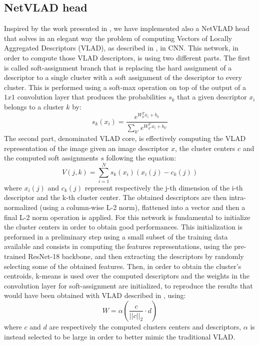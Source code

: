 \documentclass[10pt,twocolumn,letterpaper]{article}
\begin{document}
\subsection{NetVLAD head}\label{sec:NETVLAD}
Inspired by the work presented in \cite{NETVLAD}, we have implemented also a NetVLAD head that solves in an 
elegant way the problem of computing Vectors of Locally Aggregated Descriptors (VLAD), as described in \cite{VLAD},
in CNN. This network, in order to compute those VLAD descriptors, is using two different parts. 
The first is called soft-assignment branch that is replacing the hard assignment of a descriptor to a single cluster
with a soft assignment of the descriptor to every cluster. This is performed using a soft-max operation on top of the output of a $1x1$
 convolution layer that produces the probabilities $s_k$ that a given descriptor $x_i$ belongs to a cluster $k$ by:
 \begin{equation}
    s_k(x_i) = {\frac{e^{W_k^T x_i+b_k}}{\sum_{k'} e^{W_{k'}^T x_i+b_{k'}}}}
 \end{equation} 
The second part, denominated VLAD core, is effectively computing the 
VLAD representation of the image given an image descriptor $x$, the cluster centers $c$ and the computed soft assignments
$s$ following the equation:
\begin{equation}
   V(j,k) = \sum_{i=1}^N s_k(x_i) (x_i(j) - c_k(j))
\end{equation} 
where $x_i(j)$ and $c_k(j)$ represent respectively the j-th dimension of the i-th descriptor and the k-th cluster center.
The obtained descriptors are then intra-normalized (using a column-wise L-2 norm), flattened into a vector and then a
final L-2 norm operation is applied.
For this network is fundamental to initialize the cluster centers in order to obtain good performances. This initialization
is preformed in a preliminary step using a small subset of the training data available and consists in computing the features 
representations, using the pre-trained ResNet-18 backbone, and then extracting the descriptors by randomly selecting some of the 
obtained features. Then, in order to obtain the cluster's centroids, k-means is used over the computed descriptors and the 
weights in the convolution layer for soft-assignment are initialized, to reproduce the results that would have been obtained
with VLAD described in \cite{VLAD}, using:
\begin{equation}
   W = \alpha ({\frac{c}{{||c||}_2}} \cdot d )
\end{equation}
where $c$ and $d$ are respectively the computed clusters centers and descriptors, $\alpha$ is instead selected to be large
in order to better mimic the traditional VLAD.
\end{document}
